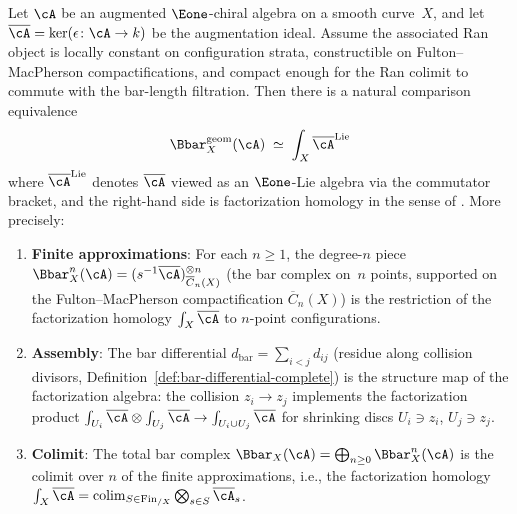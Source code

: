 \begin{proposition}
\label{prop:bar-fh}
Let $\cA$ be an augmented $\Eone$-chiral algebra on a smooth
curve~$X$, and let $\overline{\cA} = \ker(\epsilon \colon \cA \to k)$
be the augmentation ideal. Assume the associated Ran object is
locally constant on configuration strata, constructible on
Fulton--MacPherson compactifications, and compact enough for the
Ran colimit to commute with the bar-length filtration. Then there is
a natural comparison equivalence
\[
\Bbar^{\mathrm{geom}}_X(\cA)
\;\simeq\;
\int_X \overline{\cA}^{\mathrm{Lie}}
\]
where $\overline{\cA}^{\mathrm{Lie}}$ denotes $\overline{\cA}$ viewed as
an $\Eone$-Lie algebra via the commutator bracket, and the right-hand
side is factorization homology in the sense of
\textup{\cite{AF15, BD04}}. More precisely:
\begin{enumerate}[label=(\roman*)]
\item \textbf{Finite approximations}: For each $n \geq 1$,
the degree-$n$ piece $\Bbar^n_X(\cA) =
(s^{-1}\overline{\cA})^{\otimes n}_{\overline{C}_n(X)}$
(the bar complex on~$n$ points, supported on the
Fulton--MacPherson compactification $\overline{C}_n(X)$) is the
restriction of the factorization homology $\int_X\overline{\cA}$
to $n$-point configurations.
\item \textbf{Assembly}: The bar differential
$d_{\mathrm{bar}} = \sum_{i < j} d_{ij}$ (residue along collision
divisors, Definition~\ref{def:bar-differential-complete}) is the
structure map of the factorization algebra:
the collision $z_i \to z_j$ implements the factorization product
$\int_{U_i}\overline{\cA} \otimes
\int_{U_j}\overline{\cA} \to
\int_{U_i \cup U_j}\overline{\cA}$
for shrinking discs $U_i \ni z_i$, $U_j \ni z_j$.
\item \textbf{Colimit}: The total bar complex
$\Bbar_X(\cA) = \bigoplus_{n \geq 0}\Bbar^n_X(\cA)$
is the colimit over $n$ of the finite approximations,
i.e., the factorization homology
$\int_X\overline{\cA} = \operatorname{colim}_{S \in
\mathrm{Fin}_{/X}} \bigotimes_{s \in S}\overline{\cA}_s$.
\end{enumerate}
\end{proposition}

